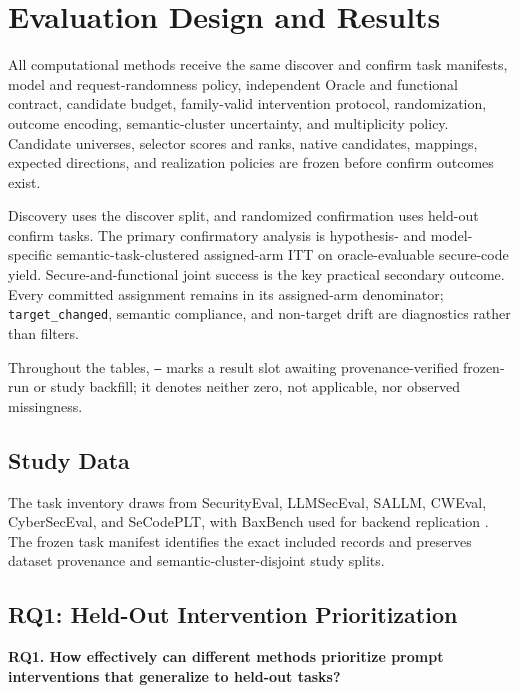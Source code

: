 \section{Evaluation Design and Results}

All computational methods receive the same discover and confirm task
manifests, model and request-randomness policy, independent Oracle and
functional contract, candidate budget, family-valid intervention protocol,
randomization, outcome encoding, semantic-cluster uncertainty, and
multiplicity policy. Candidate universes, selector scores and ranks, native
candidates, mappings, expected directions, and realization policies are frozen
before confirm outcomes exist.

Discovery uses the discover split, and randomized confirmation uses held-out
confirm tasks. The primary confirmatory analysis is hypothesis- and
model-specific semantic-task-clustered assigned-arm ITT on oracle-evaluable
secure-code yield. Secure-and-functional joint success is the key practical
secondary outcome. Every
committed assignment remains in its assigned-arm denominator;
\texttt{target\_changed}, semantic compliance, and non-target drift are
diagnostics rather than filters.

Throughout the tables, \texttt{--} marks a result slot awaiting
provenance-verified frozen-run or study backfill; it denotes neither zero, not
applicable, nor observed missingness.

\subsection{Study Data}

The task inventory draws from SecurityEval, LLMSecEval, SALLM, CWEval,
CyberSecEval, and SeCodePLT, with BaxBench used for backend replication
\cite{siddiq2022securityeval,tony2023llmseceval,siddiq2024sallm,
peng2025cweval,bhatt2023cyberseceval,nie2025secodeplt,vero2025baxbench}.
The frozen task manifest identifies the exact included records and preserves
dataset provenance and semantic-cluster-disjoint study splits.

\subsection{RQ1: Held-Out Intervention Prioritization}

\textbf{RQ1. How effectively can different methods prioritize prompt
interventions that generalize to held-out tasks?}

